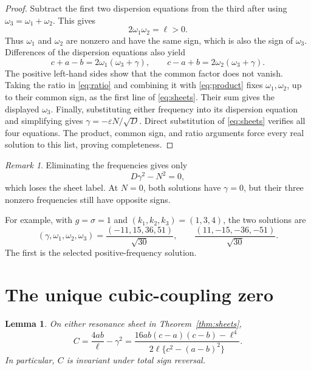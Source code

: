 \documentclass[11pt]{article}
\newtheorem{lemma}{Lemma}
\theoremstyle{remark}
\newtheorem{remark}{Remark}
\begin{document}
\begin{proof}
Subtract the first two dispersion equations from the third after using
\(\omega_3=\omega_1+\omega_2\). This gives
\begin{equation}
  2\omega_1\omega_2=\ell>0.                     \label{eq:product}
\end{equation}
Thus \(\omega_1\) and \(\omega_2\) are nonzero and have the same sign, which
is also the sign of \(\omega_3\). Differences of the dispersion equations
also yield
\begin{equation}
 c+a-b=2\omega_1(\omega_3+\gamma),\qquad
 c-a+b=2\omega_2(\omega_3+\gamma).              \label{eq:ratio}
\end{equation}
The positive left-hand sides show that the common factor does not vanish.
Taking the ratio in \eqref{eq:ratio} and combining it with
\eqref{eq:product} fixes \(\omega_1,\omega_2\), up to their common sign, as
the first line of \eqref{eq:sheets}. Their sum gives the displayed
\(\omega_3\). Finally, substituting either frequency into its dispersion
equation and simplifying gives
\(\gamma=-\varepsilon N/\sqrt D\). Direct substitution of
\eqref{eq:sheets} verifies all four equations. The product, common sign,
and ratio arguments force every real solution to this list, proving
completeness.
\end{proof}

\begin{remark}
Eliminating the frequencies gives only
\[
  D\gamma^2-N^2=0,
\]
which loses the sheet label. At \(N=0\), both solutions have
\(\gamma=0\), but their three nonzero frequencies still have opposite
signs.
\end{remark}

For example, with \(g=\sigma=1\) and \((k_1,k_2,k_3)=(1,3,4)\), the two
solutions are
\begin{equation}
 (\gamma,\omega_1,\omega_2,\omega_3)
 =\frac{(-11,15,36,51)}{\sqrt{30}},\qquad
 \frac{(11,-15,-36,-51)}{\sqrt{30}}.            \label{eq:example-sheets}
\end{equation}
The first is the selected positive-frequency solution.

\section{The unique cubic-coupling zero}

\begin{lemma}\label{lem:C}
On either resonance sheet in Theorem~\ref{thm:sheets},
\begin{equation}
 C=\frac{4ab}{\ell}-\gamma^2
  =\frac{16ab(c-a)(c-b)-\ell^4}
  {2\ell\{c^2-(a-b)^2\}}.                       \label{eq:Crational}
\end{equation}
In particular, \(C\) is invariant under total sign reversal.
\end{lemma}
\end{document}
